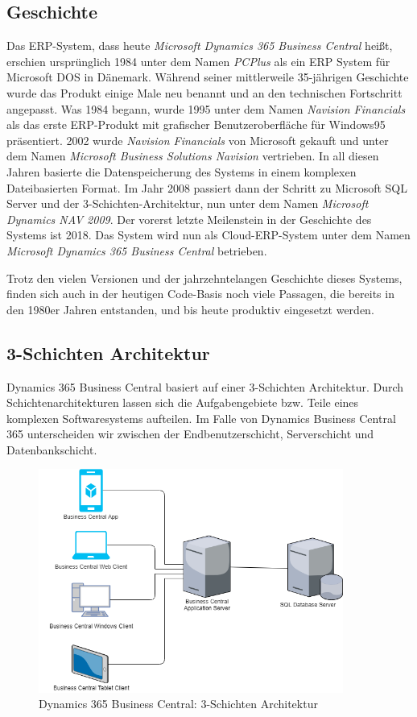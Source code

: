 \subsection{Geschichte}
\label{subsec:Geschichte}
Das ERP-System, dass heute \textit{Microsoft Dynamics 365 Business Central} heißt, erschien ursprünglich 1984 unter dem Namen \textit{PCPlus} als ein ERP System für Microsoft DOS in Dänemark\cite{DesignAndImplementationGayer}. Während seiner mittlerweile 35-jährigen Geschichte wurde das Produkt einige Male neu benannt und an den technischen Fortschritt angepasst. Was 1984 begann, wurde 1995 unter dem Namen \textit{Navision Financials} als das erste ERP-Produkt mit grafischer Benutzeroberfläche für Windows95 präsentiert. 2002 wurde \textit{Navision Financials} von Microsoft gekauft und unter dem Namen \textit{Microsoft Business Solutions Navision} vertrieben. In all diesen Jahren basierte die Datenspeicherung des Systems in einem komplexen Dateibasierten Format. Im Jahr 2008 passiert dann der Schritt zu Microsoft SQL Server und der 3-Schichten-Architektur, nun unter dem Namen \textit{Microsoft Dynamics NAV 2009}. Der vorerst letzte Meilenstein in der Geschichte des Systems ist 2018. Das System wird nun als Cloud-ERP-System unter dem Namen \textit{Microsoft Dynamics 365 Business Central} betrieben.

Trotz den vielen Versionen und der jahrzehntelangen Geschichte dieses Systems, finden sich auch in der heutigen Code-Basis noch viele Passagen, die bereits in den 1980er Jahren entstanden, und bis heute produktiv eingesetzt werden.

\subsection{3-Schichten Architektur}
\label{subsec:3-Schichten Architektur}
Dynamics 365 Business Central basiert auf einer 3-Schichten Architektur. Durch Schichtenarchitekturen lassen sich die Aufgabengebiete bzw. Teile eines komplexen Softwaresystems aufteilen. Im Falle von Dynamics Business Central 365 unterscheiden wir zwischen der Endbenutzerschicht, Serverschicht und Datenbankschicht.

\begin{figure}[h]
	\centering
	\includegraphics[width=100mm]{images/3TierArchitecture.png}
	\caption{Dynamics 365 Business Central: 3-Schichten Architektur}
	\label{fig:Image3TierArchitecture}
\end{figure}

